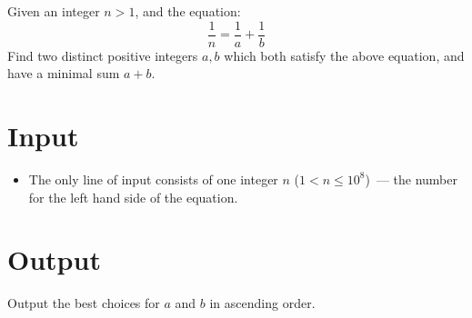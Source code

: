 
Given an integer $n>1$, and the equation: $$ \frac{1}{n}=\frac{1}{a}+
\frac{1}{b}$$ Find two distinct positive integers $a,b$ which both satisfy the
above equation, and have a minimal sum $a+b$.


\section*{Input}

\begin{itemize}
  \item The only line of input consists of one integer $n$ ($1 < n \le
      10^8$)~--- the number for the left hand side of the equation.
\end{itemize}

\section*{Output}

Output the best choices for $a$ and $b$ in ascending order.
